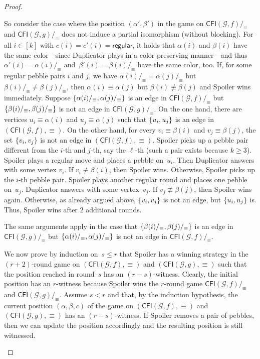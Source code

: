 \documentclass[a4paper,english, thm-restate]{lipics-v2021}
\DeclarePairedDelimiter\set{\lbrace}{\rbrace}
\newcommand{\regular}{\mathsf{regular}}
\newcommand{\comp}{\equiv}
\newcommand{\CFIsym}{\mathsf{CFI}}
\newcommand{\CFI}[1]{\CFIsym(#1)}
\newcommand{\compCFI}[2]{\CFI{#1}/_{#2}}
\newcommand{\precompCFI}[2]{{(\CFI{#1},#2)}}
\newcommand{\graphG}{\mathcal{G}}
\begin{document}
\begin{proof}
\begin{enumerate}
        So consider the case where the position $(\alpha',\beta')$ in the game on $\compCFI{\graphG,f}{\comp}$ and $\compCFI{\graphG,g}{\comp}$ does not induce a partial isomorphism (without blocking). 
        For all $i \in [k]$ with $c(i)=c'(i) = \regular$,
        it holds that $\alpha(i)$ and $\beta(i)$ have the same color---since Duplicator plays in a color-preserving manner---and thus $\alpha'(i) = \alpha(i)/_\comp$ and~$\beta'(i) = \beta(i)/_\comp$ have the same color, too.
        If, for some regular pebble pairs $i$ and $j$, we have $\alpha(i)/_\comp=\alpha(j)/_\comp$ but $\beta(i)/_\comp\neq \beta(j)/_\comp$,
        then  $\alpha(i) \comp \alpha(j)$ but
        $\beta(i) \not\comp \beta(j)$ and Spoiler wins immediately.
        Suppose $\set{\alpha(i)/_\comp, \alpha(j)/_\comp}$ is an edge in $\compCFI{\graphG,f}{\comp}$
        but $\set{\beta(i)/_\comp, \beta(j)/_\comp}$ is not an edge in $\compCFI{\graphG,g}{\comp}$.
On the one hand, there are vertices $u_i\comp \alpha(i)$ and $u_j\comp \alpha(j)$
        such that $\set{u_i,u_j}$ is an edge in $\precompCFI{\graphG,f}{\comp}$.
        On the other hand, for every $v_i\comp \beta(i)$ and $v_j\comp \beta(j)$,
        the set $\set{v_i,v_j}$ is not an edge in $\precompCFI{\graphG,f}{\comp}$.
        Spoiler picks up a pebble pair different from the $i$-th and $j$-th,
        say the $\ell$-th
        (such a pair exists because $k \geq 3$).
        Spoiler plays a regular move and places a pebble on~$u_i$.
        Then Duplicator answers with some vertex $v_i$.
        If $v_i \not \comp \beta(i)$, then Spoiler wins.
        Otherwise, Spoiler picks up the $i$-th pebble pair.
        Spoiler plays another regular round and
        places one pebble on~$u_j$.
        Duplicator answers with some vertex~$v_j$.
        If $v_j \not \comp \beta(j)$,
        then Spoiler wins again.
        Otherwise, as already argued above, $\set{v_i,v_j}$ is not an edge, but $\set{u_i,u_j}$ is.
        Thus, Spoiler wins after $2$ additional rounds.
        
        The same arguments apply in the case that $\set{\beta(i)/_\comp, \beta(j)/_\comp}$  is an edge in $\compCFI{\graphG,g}{\comp}$
        but  $\set{\alpha(i)/_\comp, \alpha(j)/_\comp}$ is not an edge in  $\compCFI{\graphG,f}{\comp}$.
        
        We now prove by induction on~$s\leq r$ that Spoiler has a winning strategy
        in the ${(r+2)}$\nobreakdash-round game on $\precompCFI{\graphG,f}{\comp}$ and $\precompCFI{\graphG,g}{\comp}$ such that the position reached in round~$s$ 
        has an $(r-s)$-witness.
        Clearly, the initial position has an $r$\nobreakdash-witness because
        Spoiler wins the $r$\nobreakdash-round game $\compCFI{\graphG,f}{\comp}$ and $\compCFI{\graphG,g}{\comp}$. Assume $s < r$ and that, by the induction hypothesis,
        the current position $(\alpha,\beta,c)$
        of the game on $\precompCFI{\graphG,f}{\comp}$ and $\precompCFI{\graphG,g}{\comp}$
        has an $(r-s)$\nobreakdash-witness.
        If Spoiler removes a pair of pebbles, then we can update the position accordingly and the resulting position is still witnessed.
        

\end{enumerate}
\end{proof}
\end{document}
